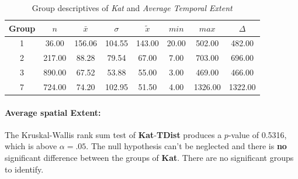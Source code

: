 \begin{table}[ht]
\begin{table}[ht]
	\small
	\centering
	\begin{tabular}{c|c|c|c|c|c|c|c}
	  	\toprule
		Group & $n$ & $\bar{x}$ & $\sigma$ & $\tilde{x}$ & $min$ & $max$ & $\Delta$ \\ 
	  	\midrule
		1 &  36.00 & 156.06 & 104.55 & 143.00 & 20.00 & 502.00 & 482.00 \\ 
	  	2 & 217.00 & 88.28 & 79.54 & 67.00 & 7.00 & 703.00 & 696.00 \\ 
	  	3 & 890.00 & 67.52 & 53.88 & 55.00 & 3.00 & 469.00 & 466.00 \\ 
	  	7 & 724.00 & 74.20 & 102.95 & 51.50 & 4.00 & 1326.00 & 1322.00 \\ 
	   	\bottomrule
	\end{tabular}
	\caption{Group descriptives of \textit{Kat} and \textit{Average Temporal Extent}}
	\label{tbl:descriptives_baysis_matched_Kat_TAvg}
	\vspace{-8mm}
\end{table}

\paragraph{Average spatial Extent:}
The Kruskal-Wallis rank sum test of \textbf{Kat}-\textbf{TDist} produces a $p$-value of 0.5316, which is above $\alpha=.05$. The null hypothesis can't be neglected and there is \textbf{no} significant difference between the groups of \textbf{Kat}. There are no significant groups to identify.


\end{table}
